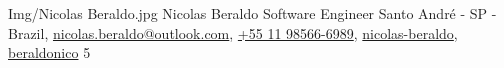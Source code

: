 \begin{Header}
	{Img/Nicolas Beraldo.jpg} %
	{Nicolas Beraldo} %
	{Software Engineer} %
	{ %
		 Santo André - SP - Brazil,
		 \href{mailto:nicolas.beraldo@outlook.com}{nicolas.beraldo@outlook.com},
		 \href{tel:+55 11 98566-6989}{+55 11 98566-6989},
		 \href{https://www.linkedin.com/in/nicolas-beraldo}{nicolas-beraldo},
		 \href{https://github.com/beraldonico}{beraldonico}
	}{5} %
\end{Header}